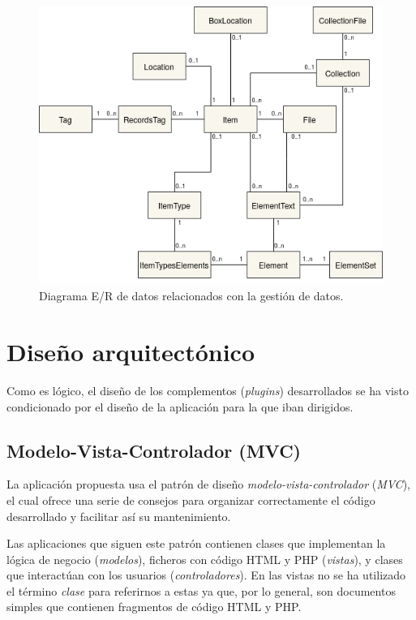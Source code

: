 \documentclass[
]{article}
\begin{document}
\begin{figure}
\hypertarget{e-r-uml}{%
\centering
\includegraphics{../_static/images/e-r-uml.png}
\caption{Diagrama E/R de datos relacionados con la gestión de
datos.}\label{e-r-uml}
}
\end{figure}

\hypertarget{diseuxf1o-arquitectuxf3nico}{%
\section{Diseño arquitectónico}\label{diseuxf1o-arquitectuxf3nico}}

Como es lógico, el diseño de los complementos (\emph{plugins})
desarrollados se ha visto condicionado por el diseño de la aplicación
para la que iban dirigidos.

\hypertarget{modelo-vista-controlador-mvc}{%
\subsection{Modelo-Vista-Controlador
(MVC)}\label{modelo-vista-controlador-mvc}}

La aplicación propuesta usa el patrón de diseño
\emph{modelo-vista-controlador} (\emph{MVC}), el cual ofrece una serie
de consejos para organizar correctamente el código desarrollado y
facilitar así su mantenimiento.

Las aplicaciones que siguen este patrón contienen clases que implementan
la lógica de negocio (\emph{modelos}), ficheros con código HTML y PHP
(\emph{vistas}), y clases que interactúan con los usuarios
(\emph{controladores}). En las vistas no se ha utilizado el término
\emph{clase} para referirnos a estas ya que, por lo general, son
documentos simples que contienen fragmentos de código HTML y PHP.
\end{document}
